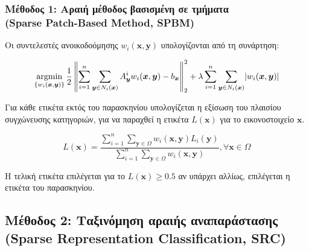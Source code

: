 \documentclass{beamer}
\newcommand{\argminB}{\mathop{\mathrm{argmin}}}
\DeclarePairedDelimiter\abs{\lvert}{\rvert}
\newcommand\norm[1]{\left\lVert#1\right\rVert}
\begin{document}
\begin{frame}
\frametitle{Μέθοδος 1: Αραιή μέθοδος βασισμένη σε τμήματα \\
(Sparse Patch-Based Method, SPBM)}

Οι συντελεστές ανοικοδοόμησης $w_i(\bm{x},\bm{y})$ υπολογίζονται από τη
συνάρτηση:

\begin{equation*}
    \argminB_{\{w_i(\bm{x},\bm{y})\}} { \frac{1} {2} \norm {\sum_{i=1}^{n}
    \sum_{\bm{y} \in N_i(\bm{x})} A_{\bm{y}}^i w_i(\bm{x},\bm{y}) -
    b_{\bm{x}}}_2^2 }
    + \lambda \sum_{i=1}^{n} \sum_{\bm{y} \in N_i(\bm{x})}
    \abs{w_i(\bm{x},\bm{y})}
\end{equation*}

Για κάθε ετικέτα εκτός του παρασκηνίου υπολογίζεται η εξίσωση του πλαισίου
συγχώνευσης κατηγοριών, για να παραχθεί η ετικέτα $L(\bm{x})$ για το
εικονοστοιχείο $\bm{x}$.

\begin{equation*}
    L(\bm{x})=\frac{ \sum_{i=1}^{n}  \sum_{\bm{y}\in\Omega}
                     w_i(\bm{x},\bm{y})L_i(\bm{y})}
    { \sum_{i=1}^{n}  \sum_{\bm{y}\in\Omega} w_i(\bm{x},\bm{y}) }
    , \forall \bm{x}\in\Omega
\end{equation*}

Η τελική ετικέτα επιλέγεται για το $L(\bm{x}) \geq 0.5$ αν υπάρχει αλλίως,
επιλέγεται η ετικέτα του παρασκηνίου.

\end{frame}


\subsection{Μέθοδος 2: Ταξινόμηση αραιής αναπαράστασης (Sparse Representation
Classification, SRC)}
\end{document}
